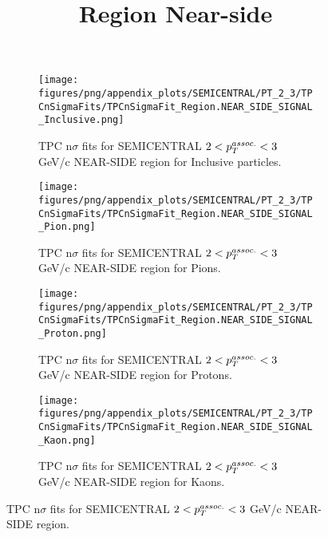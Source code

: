             \begin{figure}[H]
                \title{Region Near-side}
                \begin{subfigure}[b]{0.5\textwidth}
                    \centering
                    \texttt{[image: figures/png/appendix\_plots/SEMICENTRAL/PT\_2\_3/TPCnSigmaFits/TPCnSigmaFit\_Region.NEAR\_SIDE\_SIGNAL\_Inclusive.png]}
                    \caption{TPC n$\sigma$ fits for SEMICENTRAL $2 < \pTassoc < 3$ GeV/c NEAR-SIDE region for Inclusive particles.}
                    \label{fig:appendix_SEMICENTRAL_$2 < \pTassoc < 3$ GeV/c_NEAR_SIDE_SIGNAL_Inclusive}
                \end{subfigure}
                \begin{subfigure}[b]{0.5\textwidth}
                    \centering
                    \texttt{[image: figures/png/appendix\_plots/SEMICENTRAL/PT\_2\_3/TPCnSigmaFits/TPCnSigmaFit\_Region.NEAR\_SIDE\_SIGNAL\_Pion.png]}
                    \caption{TPC n$\sigma$ fits for SEMICENTRAL $2 < \pTassoc < 3$ GeV/c NEAR-SIDE region for Pions.}
                    \label{fig:appendix_SEMICENTRAL_$2 < \pTassoc < 3$ GeV/c_NEAR_SIDE_SIGNAL_Pion}
                \end{subfigure}
                \begin{subfigure}[b]{0.5\textwidth}
                    \centering
                    \texttt{[image: figures/png/appendix\_plots/SEMICENTRAL/PT\_2\_3/TPCnSigmaFits/TPCnSigmaFit\_Region.NEAR\_SIDE\_SIGNAL\_Proton.png]}
                    \caption{TPC n$\sigma$ fits for SEMICENTRAL $2 < \pTassoc < 3$ GeV/c NEAR-SIDE region for Protons.}
                    \label{fig:appendix_SEMICENTRAL_$2 < \pTassoc < 3$ GeV/c_NEAR_SIDE_SIGNAL_Proton}
                \end{subfigure}
                \begin{subfigure}[b]{0.5\textwidth}
                    \centering
                    \texttt{[image: figures/png/appendix\_plots/SEMICENTRAL/PT\_2\_3/TPCnSigmaFits/TPCnSigmaFit\_Region.NEAR\_SIDE\_SIGNAL\_Kaon.png]}
                    \caption{TPC n$\sigma$ fits for SEMICENTRAL $2 < \pTassoc < 3$ GeV/c NEAR-SIDE region for Kaons.}
                    \label{fig:appendix_SEMICENTRAL_$2 < \pTassoc < 3$ GeV/c_NEAR_SIDE_SIGNAL_Kaon}
                \end{subfigure}
                \caption{TPC n$\sigma$ fits for SEMICENTRAL $2 < \pTassoc < 3$ GeV/c NEAR-SIDE region.}
                \label{fig:appendix_SEMICENTRAL_$2 < \pTassoc < 3$ GeV/c_NEAR_SIDE_SIGNAL}
            \end{figure}
